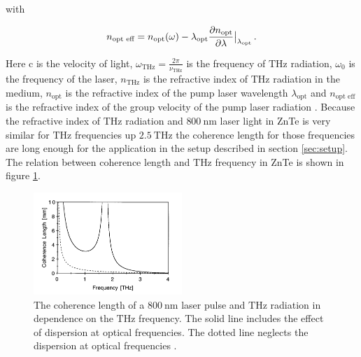 with 

\begin{equation}
    n_{\text{opt eff}} = n_\text{opt}(\omega) - \lambda_\text{opt}\frac{\partial n_\text{opt}}{\partial \lambda}\big{|}_{\lambda_\text{opt}} \, .  
\end{equation}

Here c is the velocity of light, $\omega_{\si{\tera\hertz}} = \frac{2\pi}{\nu_{\si{\tera\hertz}}}$ is the frequency of $\si{\tera\hertz}$ radiation, $\omega_0$ is the frequency of the laser, $n_{\si{\tera\hertz}}$ is the refractive index of $\si{\tera\hertz}$ radiation in the medium, $n_\text{opt}$ is the refractive index of the pump laser wavelength $\lambda_\text{opt}$ and $n_\text{opt eff}$ is the refractive index of the group velocity of the pump laser radiation \cite{coherence_legnth}.
Because the refractive index of $\si{\tera\hertz}$ radiation and $\SI{800}{\nano\meter}$ laser light in ZnTe is very similar for $\si{\tera\hertz}$ frequencies up $\SI{2.5}{\tera\hertz}$ \cite{coherence_legnth} the coherence length for those frequencies are long enough for the application in the setup described in section \ref{sec:setup}.
The relation between coherence length and $\si{\tera\hertz}$ frequency in ZnTe is shown in figure \ref{fig:coherence_legnth}.

\begin{figure}
    \centering
    \includegraphics[width=0.5\textwidth]{refferenced_pic/coherence_length_ZnTe.png}
    \caption{The coherence length of a $\SI{800}{\nano\meter}$ laser pulse and $\si{\tera\hertz}$ radiation in dependence on the $\si{\tera\hertz}$ frequency.
    The solid line includes the effect of dispersion at optical frequencies. The dotted line neglects the dispersion at optical frequencies \cite{coherence_legnth}.}
    \label{fig:coherence_legnth}
\end{figure}
\FloatBarrier
